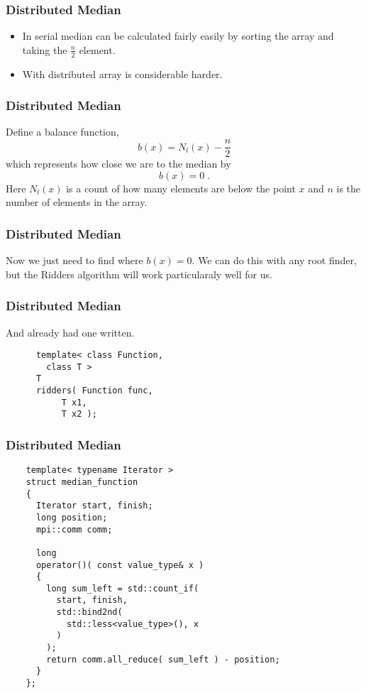\begin{frame}
  \frametitle{Distributed Median}
  \begin{itemize}
    \item In serial median can be calculated fairly
  easily by sorting the array and taking
  the $\frac{n}{2}$ element.
  \item With distributed array is considerable harder.
  \end{itemize}
\end{frame}

\begin{frame}
  \frametitle{Distributed Median}
  Define a balance function,
  \[ b(x) = N_l(x) - \frac{n}{2} \]
  which represents how close we are to the median by
  \[ b(x) = 0 \; . \]
  Here $N_l(x)$ is a count of how many elements are below the point $x$
  and $n$ is the number of elements in the array.
\end{frame}

\begin{frame}
  \frametitle{Distributed Median}
  Now we just need to find where $b(x) = 0$. We can do
  this with any root finder, but the Ridders algorithm
  will work particularaly well for us.
\end{frame}

\begin{frame}[fragile]
  \frametitle{Distributed Median}
  And already had one written.
  \begin{example}
    \begin{lstlisting}
      template< class Function,
		class T >
      T
      ridders( Function func,
	       T x1,
	       T x2 );
    \end{lstlisting}
  \end{example}
\end{frame}

\begin{frame}[fragile]
  \frametitle{Distributed Median}
  \begin{example}
    \begin{lstlisting}
    template< typename Iterator >
    struct median_function
    {
      Iterator start, finish;
      long position;
      mpi::comm comm;

      long
      operator()( const value_type& x )
      {
        long sum_left = std::count_if(
          start, finish,
          std::bind2nd(
            std::less<value_type>(), x
          )
        );
        return comm.all_reduce( sum_left ) - position;
      }
    };
    \end{lstlisting}
  \end{example}
\end{frame}

